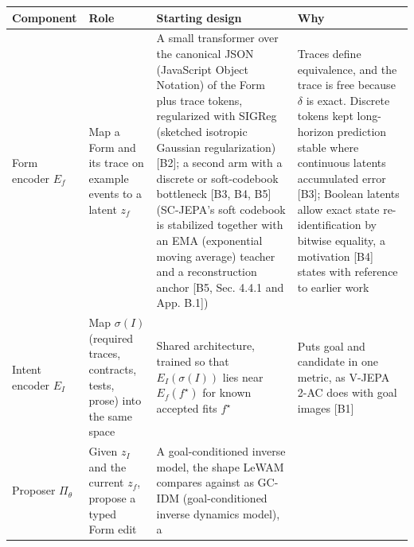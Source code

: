 \documentclass[10pt,letterpaper]{article}
\begin{document}
{\footnotesize\setlength{\tabcolsep}{3.8pt}\renewcommand{\arraystretch}{1.15}
\begin{longtable}[]{@{}
  >{\raggedright\arraybackslash}p{}
  >{\raggedright\arraybackslash}p{}
  >{\raggedright\arraybackslash}p{}
  >{\raggedright\arraybackslash}p{}@{}}
\toprule\noalign{}
\begin{minipage}[b]{\linewidth}\raggedright
\textbf{Component}
\end{minipage} & \begin{minipage}[b]{\linewidth}\raggedright
\textbf{Role}
\end{minipage} & \begin{minipage}[b]{\linewidth}\raggedright
\textbf{Starting design}
\end{minipage} & \begin{minipage}[b]{\linewidth}\raggedright
\textbf{Why}
\end{minipage} \\
\midrule\noalign{}
\endhead
\bottomrule\noalign{}
\endlastfoot
Form encoder \(E_f\) & Map a Form and its trace on example events to a
latent \(z_f\) & A small transformer over the canonical JSON (JavaScript
Object Notation) of the Form plus trace tokens, regularized with SIGReg
(sketched isotropic Gaussian regularization) {[}B2{]}; a second arm with
a discrete or soft-codebook bottleneck {[}B3, B4, B5{]} (SC-JEPA's soft
codebook is stabilized together with an EMA (exponential moving average)
teacher and a reconstruction anchor {[}B5, Sec. 4.4.1 and App. B.1{]}) &
Traces define equivalence, and the trace is free because \(\delta\) is
exact. Discrete tokens kept long-horizon prediction stable where
continuous latents accumulated error {[}B3{]}; Boolean latents allow
exact state re-identification by bitwise equality, a motivation {[}B4{]}
states with reference to earlier work \\
Intent encoder \(E_I\) & Map \(\sigma(I)\) (required traces, contracts,
tests, prose) into the same space & Shared architecture, trained so that
\(E_I(\sigma(I))\) lies near \(E_f(f^\star)\) for known accepted fits
\(f^\star\) & Puts goal and candidate in one metric, as V-JEPA 2-AC does
with goal images {[}B1{]} \\
Proposer \(\Pi_\theta\) & Given \(z_I\) and the current \(z_f\), propose
a typed Form edit & A goal-conditioned inverse model, the shape LeWAM
compares against as GC-IDM (goal-conditioned inverse dynamics model), a

\end{longtable}}
\end{document}
